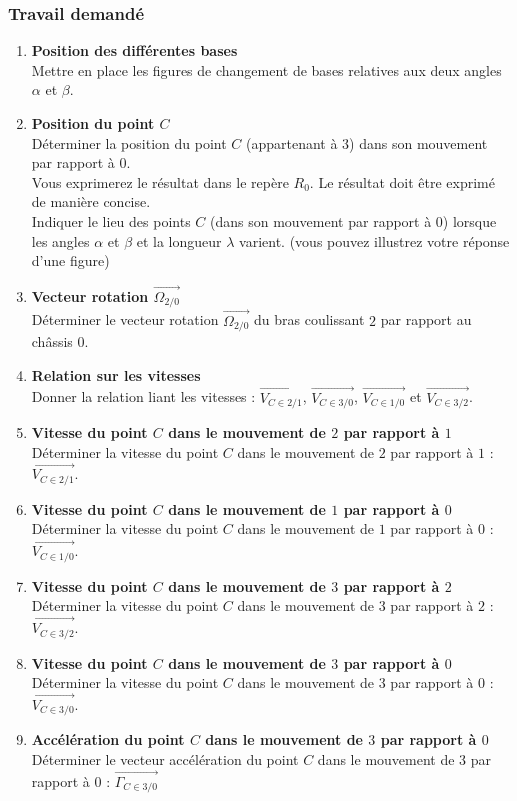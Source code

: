 \subsubsection{Travail demandé}
\begin{enumerate}
\item \textbf{Position des différentes bases}\\
Mettre en place les figures de changement de bases relatives aux deux angles $\alpha$ et $\beta$.
\item \textbf{Position du point $C$}\\
Déterminer la position du point $C$ (appartenant à $3$) dans son mouvement par rapport à $0$.\\
Vous exprimerez le résultat dans le repère $R_0$. Le résultat doit être exprimé de manière concise.\\
Indiquer le lieu des points $C$ (dans son mouvement par rapport à $0$) lorsque les angles $\alpha$ et $\beta$ et la longueur $\lambda$ varient. (vous pouvez illustrez votre réponse d’une figure)
\item \textbf{Vecteur rotation $\overrightarrow{\Omega_{2/0}}$}\\
Déterminer le vecteur rotation $\overrightarrow{\Omega_{2/0}}$ du bras coulissant $2$ par rapport au châssis $0$.
\item \textbf{Relation sur les vitesses}\\
Donner la relation liant les vitesses : $\overrightarrow{V_{C\in2/1}}$, $\overrightarrow{V_{C\in3/0}}$, $\overrightarrow{V_{C\in1/0}}$ et $\overrightarrow{V_{C\in3/2}}$.
\item \textbf{Vitesse du point $C$ dans le mouvement de $2$ par rapport à $1$}\\
Déterminer la vitesse du point $C$ dans le mouvement de $2$ par rapport à $1$ : $\overrightarrow{V_{C\in2/1}}$.
\item \textbf{Vitesse du point $C$ dans le mouvement de $1$ par rapport à $0$}\\
Déterminer la vitesse du point $C$ dans le mouvement de $1$ par rapport à $0$ : $\overrightarrow{V_{C\in1/0}}$.
\item \textbf{Vitesse du point $C$ dans le mouvement de $3$ par rapport à $2$}\\
Déterminer la vitesse du point $C$ dans le mouvement de $3$ par rapport à $2$ : $\overrightarrow{V_{C\in3/2}}$.
\item \textbf{Vitesse du point $C$ dans le mouvement de $3$ par rapport à $0$}\\
Déterminer la vitesse du point $C$ dans le mouvement de $3$ par rapport à $0$ : $\overrightarrow{V_{C\in3/0}}$.
\item \textbf{Accélération du point $C$ dans le mouvement de $3$ par rapport à $0$}\\
Déterminer le vecteur accélération du point $C$ dans le mouvement de $3$ par rapport à $0$ : $\overrightarrow{\Gamma_{C\in3/0}}$
\end{enumerate}

